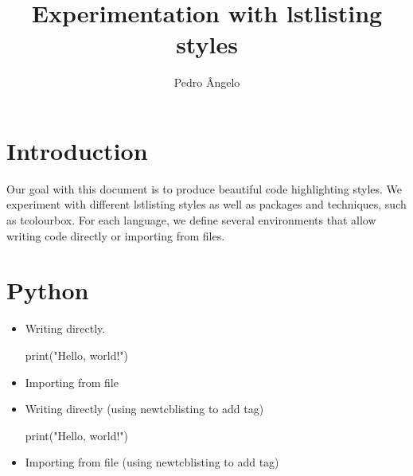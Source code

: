 \documentclass[a4paper]{article}
\title{Experimentation with lstlisting styles}
\author{Pedro Ângelo}
\begin{document}
\maketitle

\section{Introduction}
Our goal with this document is to produce beautiful code highlighting styles.
We experiment with different lstlisting styles as well as packages and techniques, such as tcolourbox.
For each language, we define several environments that allow writing code directly or importing from files.

\section{Python}

\begin{itemize}
\item Writing directly.
\begin{pythoncode}
print("Hello, world!")
\end{pythoncode}

\item Importing from file

\item Writing directly (using newtcblisting to add tag)
\begin{pythoncodetag}
print("Hello, world!")
\end{pythoncodetag}

\item Importing from file (using newtcblisting to add tag)
\end{itemize}
\end{document}
